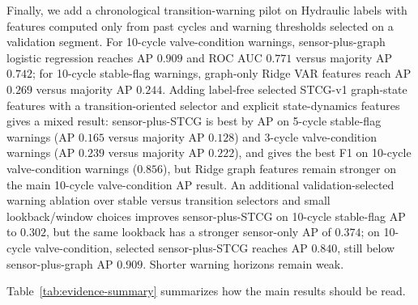 \documentclass[sigconf,review,anonymous]{acmart}
\begin{document}
Finally, we add a chronological transition-warning pilot on Hydraulic labels with features computed only from past cycles and warning thresholds selected on a validation segment.
For 10-cycle valve-condition warnings, sensor-plus-graph logistic regression reaches AP $0.909$ and ROC AUC $0.771$ versus majority AP $0.742$; for 10-cycle stable-flag warnings, graph-only Ridge VAR features reach AP $0.269$ versus majority AP $0.244$.
Adding label-free selected STCG-v1 graph-state features with a transition-oriented selector and explicit state-dynamics features gives a mixed result: sensor-plus-STCG is best by AP on 5-cycle stable-flag warnings (AP $0.165$ versus majority AP $0.128$) and 3-cycle valve-condition warnings (AP $0.239$ versus majority AP $0.222$), and gives the best F1 on 10-cycle valve-condition warnings ($0.856$), but Ridge graph features remain stronger on the main 10-cycle valve-condition AP result.
An additional validation-selected warning ablation over stable versus transition selectors and small lookback/window choices improves sensor-plus-STCG on 10-cycle stable-flag AP to $0.302$, but the same lookback has a stronger sensor-only AP of $0.374$; on 10-cycle valve-condition, selected sensor-plus-STCG reaches AP $0.840$, still below sensor-plus-graph AP $0.909$.
Shorter warning horizons remain weak.

\begin{table}[t]
\caption{Initial real benchmark one-step forecasting RMSE on ETT small, BeijingPM25, OccupancySensors, AReMActivities, UCIHARWindowSignals, and HydraulicSystems datasets. Mask columns use hard graph feature selection; weight columns use graph-weighted ridge. Lower is better.}
\label{tab:real-forecasting}
\centering
\small
\resizebox{\linewidth}{!}{}
\end{table}

Table~\ref{tab:evidence-summary} summarizes how the main results should be read.
\begin{table}[t]
\caption{Evidence summary across synthetic and real probes.}
\label{tab:evidence-summary}
\centering
\small
\resizebox{\linewidth}{!}{}
\end{table}
\end{document}
